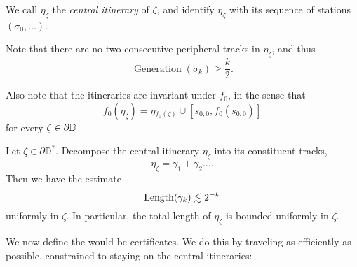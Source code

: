 

We call $\eta_{\zeta}$ the \emph{central itinerary} of $\zeta$, and identify $\eta_{\zeta}$ with its sequence of stations $(\sigma_0,\ldots)$.

Note that there are no two consecutive peripheral tracks in $\eta_{\zeta}$, and thus 
\begin{equation} \label{generation-lower-bound}
\operatorname{Generation}(\sigma_k)\geq \frac k2.
\end{equation}

Also note that the itineraries are invariant under $f_{0}$, in the sense that
\begin{equation*}
f_{0}(\eta_{\zeta})=\eta{}_{f_{0}(\zeta)}\cup[s_{0,0},f_0(s_{0,0})]
\end{equation*}
for every $\zeta\in\partial\mathbb{D}$.

\begin{lemma} \label{track_decay}
Let $\zeta\in \partial \mathbb D^*$. Decompose the central itinerary $\eta_{\zeta}$ into its constituent tracks, 
$$\eta_{\zeta}=\gamma _1 + \gamma_2\ldots .$$ 
	Then we have the estimate $$\operatorname{Length}(\gamma_{k})\lesssim2^{-k}$$ uniformly in $\zeta$. 
In particular, the total length of $\eta_\zeta$ is bounded uniformly in $\zeta$.
\end{lemma}



We now define the would-be certificates. We do this by traveling as efficiently as possible, constrained to staying on the central itineraries:



